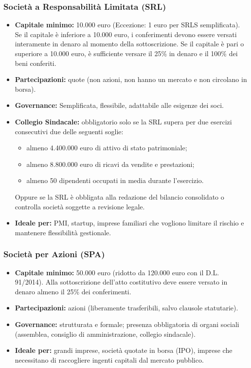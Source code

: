 \documentclass[a4paper,12pt]{article}
\begin{document}
	\subsubsection{Società a Responsabilità Limitata (SRL)}
	
	\begin{itemize}
		\item \textbf{Capitale minimo:} 10.000 euro (Eccezione: 1 euro per SRLS semplificata).%
		Se il capitale è inferiore a 10.000 euro, i conferimenti devono essere versati interamente in denaro al momento della sottoscrizione.%
		Se il capitale è pari o superiore a 10.000 euro, è sufficiente versare il 25\% in denaro e il 100\% dei beni conferiti.
		\item \textbf{Partecipazioni:} quote (non azioni, non hanno un mercato e non circolano in borsa).
		\item \textbf{Governance:} Semplificata, flessibile, adattabile alle esigenze dei soci.
		\item \textbf{Collegio Sindacale:} obbligatorio solo se la SRL supera per due esercizi consecutivi due delle seguenti soglie:
		\begin{itemize}
			\item almeno 4.400.000 euro di attivo di stato patrimoniale;
			\item almeno 8.800.000 euro di ricavi da vendite e prestazioni;
			\item almeno 50 dipendenti occupati in media durante l'esercizio.
		\end{itemize}
		Oppure se la SRL è obbligata alla redazione del bilancio consolidato o controlla società soggette a revisione legale.
		\item \textbf{Ideale per:} PMI, startup, imprese familiari che vogliono limitare il rischio e mantenere flessibilità gestionale.
	\end{itemize}
	
	\subsubsection{Società per Azioni (SPA)}
	
	\begin{itemize}
		\item \textbf{Capitale minimo:} 50.000 euro (ridotto da 120.000 euro con il D.L. 91/2014).%
		Alla sottoscrizione dell'atto costitutivo deve essere versato in denaro almeno il 25\% dei conferimenti.
		\item \textbf{Partecipazioni:} azioni (liberamente trasferibili, salvo clausole statutarie).
		\item \textbf{Governance:} strutturata e formale; presenza obbligatoria di organi sociali (assemblea, consiglio di amministrazione, collegio sindacale).
		\item \textbf{Ideale per:} grandi imprese, società quotate in borsa (IPO), imprese che necessitano di raccogliere ingenti capitali dal mercato pubblico.
	\end{itemize}
	
\end{document}
